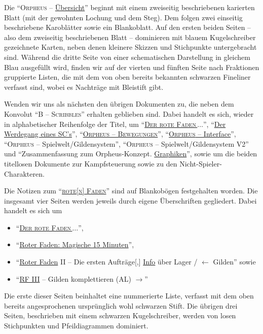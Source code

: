 \documentclass[a5paper,pagesize,numbers=noenddot]{scrbook}
\begin{document}
Die \enquote{\textsc{Orpheus} -- \uline{Übersicht}} beginnt mit einem zweiseitig beschriebenen karierten Blatt (mit der gewohnten Lochung und dem Steg).
Dem folgen zwei einseitig beschriebene Karoblätter sowie ein Blankoblatt.
Auf den ersten beiden Seiten -- also dem zweiseitig beschriebenen Blatt -- dominieren mit blauem Kugelschreiber gezeichnete Karten, neben denen kleinere Skizzen und Stichpunkte untergebracht sind.
Während die dritte Seite von einer schematischen Darstellung in gleichem Blau ausgefüllt wird, finden wir auf der vierten und fünften Seite nach Fraktionen gruppierte Listen, die mit dem von oben bereits bekannten schwarzen Fineliner verfasst sind, wobei es Nachträge mit Bleistift gibt.

Wenden wir uns als nächsten den übrigen Dokumenten zu, die neben dem Konvolut \enquote{\textsc{B -- Scribbles}} erhalten geblieben sind.
Dabei handelt es sich, wieder in alphabetischer Reihenfolge der Titel, um \enquote{\uline{\textsc{Der rote Faden\,$\ldots$}}}, \enquote{\uline{Der Werdegang eines SC's}}, \enquote{\uline{\textsc{Orpheus -- Bewegungen}}}, \enquote{\uline{\textsc{Orpheus} -- Interface}}, \enquote{\textsc{Orpheus} -- Spielwelt/Gildensystem}, \enquote{\textsc{Orpheus} -- Spielwelt/Gildensystem V2} und \enquote{Zusammenfassung zum Orpheus-Konzept. \uline{Graphiken}}, sowie um die beiden titellosen Dokumente zur Kampfsteuerung sowie zu den Nicht-Spieler-Charakteren.


Die Notizen zum \enquote{\uline{\textsc{rote[n] Faden}}} sind auf Blankobögen festgehalten worden.
Die insgesamt vier Seiten werden jeweils durch eigene Überschriften gegliedert.
Dabei handelt es sich um

\begin{itemize}
   \item \enquote{\uline{\textsc{Der rote Faden\,$\ldots$}}},
   \item \enquote{\uline{Roter Faden: Magische 15 Minuten}},
   \item \enquote{\uline{Roter Faden} II -- Die ersten Aufträge[,] \uline{Info} über Lager / $\leftarrow$ Gilden} sowie
   \item \enquote{\uline{RF III} -- Gilden komplettieren (AL) $\rightarrow$}
\end{itemize}

\noindent Die erste dieser Seiten beinhaltet eine nummerierte Liste, verfasst mit dem oben bereits angesprochenen ursprünglich wohl schwarzen Stift.
Die übrigen drei Seiten, beschrieben mit einem schwarzen Kugelschreiber, werden von losen Stichpunkten und Pfeildiagrammen dominiert.
\end{document}

